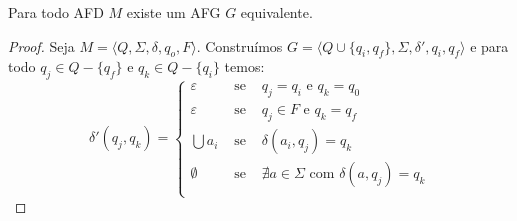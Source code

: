 \begin{lemma}
\label{lemma:afg1}
Para todo AFD $M$ existe um AFG $G$ equivalente.
\end{lemma}
\begin{proof}
  Seja  $M = \langle Q, \Sigma, \delta, q_o, F \rangle$.
  Construímos $G = \langle Q \cup \{q_i, q_f\}, \Sigma, \delta', q_i, q_f \rangle$ e para todo $q_j \in Q - \{q_f\}$ e $q_k \in Q - \{q_i\}$ temos:
\begin{displaymath}
 \delta'(q_j, q_k) = \left\{
    \begin{array}{ccc}
      \varepsilon & \textrm{ se } & q_j = q_i \textrm{ e } q_k = q_0\\
      \varepsilon & \textrm{ se } & q_j \in F \textrm{ e } q_k = q_f\\
      \bigcup a_i & \textrm{ se } & \delta(a_i, q_j) = q_k \\
      \emptyset   & \textrm{ se } & \nexists a \in \Sigma \textrm{ com } \delta(a, q_j) = q_k \\
    \end{array}\right.
\end{displaymath}
\end{proof}



